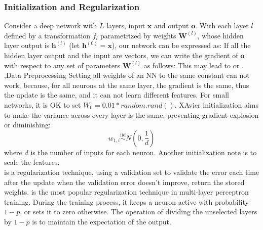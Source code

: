 \documentclass[10pt]{report}
\begin{document}
\subsubsection{Initialization and Regularization}
Consider a deep network with $L$ layers, input $\mathbf{x}$ and output $\mathbf{o}$. With each layer $l$ defined by a transformation $f_l$ parametrized by weights $\mathbf{W}^{(l)}$, whose hidden layer output is $\mathbf{h}^{(l)}$ (let $\mathbf{h}^{(0)} = \mathbf{x}$), our network can be expressed as:
If all the hidden layer output and the input are vectors, we can write the gradient of $\mathbf{o}$ with respect to any set of parameters $\mathbf{W}^{(l)}$ as follows:
This may lead to  or . 
\sep{Data Preprocessing}
Setting all weights of an NN to the same constant can not work, because, for all neurons at the same layer, the gradient is the same, thus the update is the same, and it can not 
learn different features. For small networks, it is OK to set $W_0=0.01*random.rand()$. XAvier initialization aims to make the variance across every layer is the same, 
preventing gradient explosion or diminishing:
\[w_{1,i}\overset{\mathrm{iid}}{\operatorname*{\sim}}N\left(0,\frac1d\right)\]
where $d$ is the number of inputs for each neuron. Another initialization note is to scale the features.\\
 is a regularization technique, using a validation set to validate the error each time after the update when the validation error doesn't improve, return the stored weights. 
 is the most popular regularization technique in multi-layer perceptron training. During the training process, it keeps a neuron active with probability $1-p$, or sets it to zero otherwise. 
The operation of dividing the unselected layers by $1-p$ is to maintain the expectation of the output.
\end{document}
